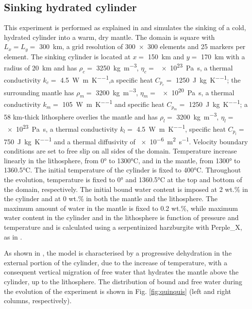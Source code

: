 \documentclass[hidelinks,10pt,a4paper]{article}
\begin{document}
{\subsection{Sinking hydrated cylinder}\label{sec:quinquis}
This experiment is performed as explained in \citet{Quinquis2014} and simulates the sinking of a cold, hydrated cylinder into a warm, dry mantle. The domain
is square with $L_x=L_y=$ \SI{300}{\km}, a grid resolution of \num{300x300} elements and 25 markers per element. The sinking cylinder is located at $x=$
\SI{150}{\km} and $y=$ \SI{170}{\km} with a radius of \SI{20}{\km} and has $\rho_c=$ \SI{3250}{\kg\per\cubic\m}, $\eta_c=$ \SI{e23}{\pascal\s}, a thermal
conductivity $k_c=$ \SI{4.5}{\watt\per\m\per\kelvin},a specific heat $C_{p_c}=$ \SI{1250}{\joule\per\kg\per\kelvin}; the surrounding mantle has $\rho_m=$
\SI{3200}{\kg\per\cubic\m}, $\eta_m=$ \SI{e20}{\pascal\s}, a thermal conductivity $k_m=$ \SI{105}{\watt\per\m\per\kelvin} and specific heat $C_{p_m}=$
\SI{1250}{\joule\per\kg\per\kelvin}; a 58 km-thick lithosphere overlies the mantle and has $\rho_l=$ \SI{3200}{\kg\per\cubic\m}, $\eta_l=$ \SI{e23}{\pascal\s},
a thermal conductivity $k_l=$ \SI{4.5}{\watt\per\m\per\kelvin}, specific heat $C_{p_l}=$ \SI{750}{\joule\per\kg\per\kelvin} and a thermal diffusivity of
\SI{e-6}{\square\m\per\s}. Velocity boundary conditions are set to free slip on all sides of the domain. Temperature increase linearly in the lithosphere,
from 0° to 1300°C, and in the mantle, from 1300° to 1360.5°C. The initial temperature of the cylinder is fixed to 400°C. Throughout the evolution, temperature
is fixed to 0° and 1360.5°C at the top and bottom of the domain, respectively. The initial bound water content is imposed at 2 wt.\% in the cylinder and at
0 wt.\% in both the mantle and the lithosphere. The maximum amount of water in the mantle is fixed to 0.2 wt.\%, while maximum water content in the cylinder
and in the lithosphere is function of pressure and temperature and is calculated using a serpentinized harzburgite with Perple\_X, as in \citet{Quinquis2014}.

As shown in \citet{Quinquis2014}, the model is characterised by a progressive dehydration in the external portion of the cylinder, due to the increase of
temperature, with a consequent vertical migration of free water that hydrates the mantle above the cylinder, up to the lithosphere. The distribution of
bound and free water during the evolution of the experiment is shown in Fig. \ref{fig:quinquis} (left and right columns, respectively).

}
\end{document}
